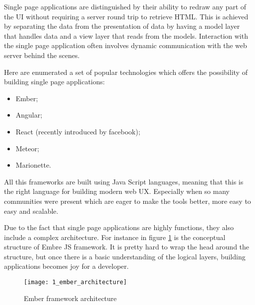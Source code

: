Single page applications are distinguished by their ability to redraw any part of the UI without requiring a server round trip to retrieve HTML. This is achieved by separating the data from the presentation of data by having a model layer that handles data and a view layer that reads from the models. Interaction with the single page application often involves dynamic communication with the web server behind the scenes.

Here are enumerated a set of popular technologies which offers the possibility of building single page applications:
\begin{itemize}
    \item Ember;
    \item Angular;
    \item React (recently introduced by facebook);
    \item Meteor;
    \item Marionette.
\end{itemize}
All this frameworks are built using Java Script languages, meaning that this is the right language for building modern web UX. Especially when so many communities were present which are eager to make the tools better, more easy to easy and scalable.

Due to the fact that single page applications are highly functions, they also include a complex architecture. For instance in figure \ref{ember_architecture} is the conceptual structure of Embre JS framework. It is pretty hard to wrap the head around the structure, but once there is a basic understanding of the logical layers, building applications becomes joy for a developer.

\begin{figure}[!ht]
\centering
\texttt{[image: 1\_ember\_architecture]}
\caption{Ember framework architecture}\label{ember_architecture}
\end{figure}

